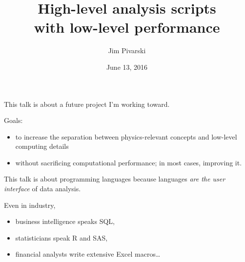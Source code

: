 \documentclass{beamer}
\title[2016-06-13-high-level-low-level]{High-level analysis scripts \\ with low-level performance}
\author{Jim Pivarski}
\institute{Princeton University -- DIANA}
\date{June 13, 2016}
\begin{document}

\begin{frame}
  \titlepage
\end{frame}



\begin{frame}{}
\vfill
This talk is about a future project I'm working toward.

\vfill
\begin{block}{Goals:}
\begin{itemize}
\item to increase the separation between physics-relevant concepts and low-level computing details
\item without sacrificing computational performance; in most cases, improving it.
\end{itemize}
\end{block}
\end{frame}

\begin{frame}{}
\vfill
This talk is about programming languages because languages {\it are the user interface} of data analysis.

\vfill
Even in industry,
\begin{itemize}
\item business intelligence speaks SQL,
\item statisticians speak R and SAS,
\item financial analysts write extensive Excel macros\ldots
\end{itemize}
\end{frame}
\end{document}
